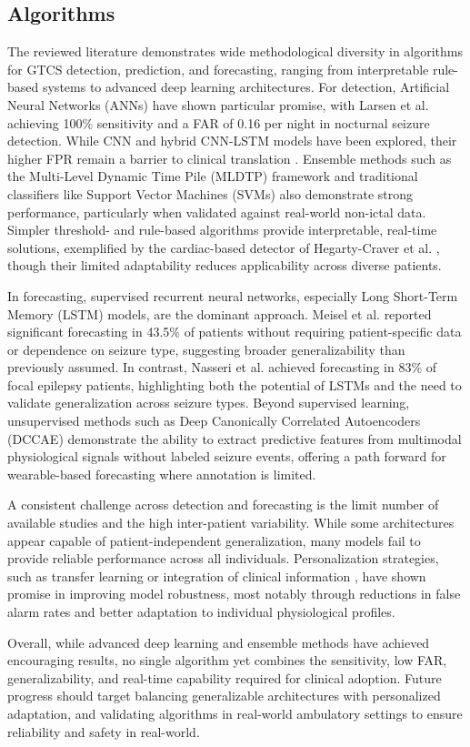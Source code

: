 \subsection{Algorithms}
The reviewed literature demonstrates wide methodological diversity in algorithms for GTCS detection, prediction, and forecasting, ranging from interpretable rule-based systems to advanced deep learning architectures. For detection, Artificial Neural Networks (ANNs) have shown particular promise, with Larsen et al. \cite{Larsen2024-vn} achieving 100\% sensitivity and a FAR of 0.16 per night in nocturnal seizure detection. While CNN and hybrid CNN-LSTM models have been explored, their higher FPR remain a barrier to clinical translation \cite{Yu2023-ss, Tang2021-td}. Ensemble methods such as the Multi-Level Dynamic Time Pile (MLDTP) framework \cite{Wu2024-yl} and traditional classifiers like Support Vector Machines (SVMs) \cite{Poh2012-af} also demonstrate strong performance, particularly when validated against real-world non-ictal data. Simpler threshold- and rule-based algorithms provide interpretable, real-time solutions, exemplified by the cardiac-based detector of Hegarty-Craver et al. \cite{Hegarty-Craver2021-hk}, though their limited adaptability reduces applicability across diverse patients.

In forecasting, supervised recurrent neural networks, especially Long Short-Term Memory (LSTM) models, are the dominant approach. Meisel et al. \cite{Meisel2020-ii} reported significant forecasting in 43.5\% of patients without requiring patient-specific data or dependence on seizure type, suggesting broader generalizability than previously assumed. In contrast, Nasseri et al. \cite{Nasseri2021-ny} achieved forecasting in 83\% of focal epilepsy patients, highlighting both the potential of LSTMs and the need to validate generalization across seizure types. Beyond supervised learning, unsupervised methods such as Deep Canonically Correlated Autoencoders (DCCAE) \cite{Vieluf2023-ta} demonstrate the ability to extract predictive features from multimodal physiological signals without labeled seizure events, offering a path forward for wearable-based forecasting where annotation is limited.

A consistent challenge across detection and forecasting is the limit number of available studies and the high inter-patient variability. While some architectures appear capable of patient-independent generalization, many models fail to provide reliable performance across all individuals. Personalization strategies, such as transfer learning \cite{Nasseri2021-xn} or integration of clinical information \cite{Vieluf2023-zv}, have shown promise in improving model robustness, most notably through reductions in false alarm rates and better adaptation to individual physiological profiles.

Overall, while advanced deep learning and ensemble methods have achieved encouraging results, no single algorithm yet combines the sensitivity, low FAR, generalizability, and real-time capability required for clinical adoption. Future progress should target balancing generalizable architectures with personalized adaptation, and validating algorithms in real-world ambulatory settings to ensure reliability and safety in real-world.
